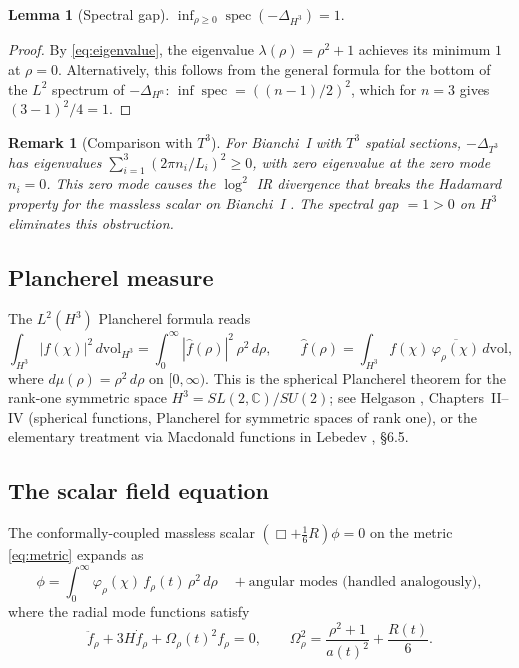\documentclass[12pt,letterpaper]{article}
\newtheorem{lemma}[theorem]{Lemma}
\newtheorem{remark}[theorem]{Remark}
\newcommand{\Cbb}{\mathbb{C}}
\DeclareMathOperator{\spec}{spec}
\begin{document}
\begin{lemma}[Spectral gap]
\label{lem:specgap}
$\displaystyle\inf_{\rho \geq 0}\spec(-\Delta_{H^3}) = 1.$
\end{lemma}
\begin{proof}
By \eqref{eq:eigenvalue}, the eigenvalue $\lambda(\rho) = \rho^2 + 1$
achieves its minimum $1$ at $\rho = 0$.
Alternatively, this follows from the general formula for the bottom
of the $L^2$ spectrum of $-\Delta_{H^n}$: $\inf\spec = ((n-1)/2)^2$,
which for $n=3$ gives $(3-1)^2/4 = 1$.
\end{proof}

\begin{remark}[Comparison with $T^3$]
For Bianchi~I with $T^3$ spatial sections,
$-\Delta_{T^3}$ has eigenvalues $\sum_{i=1}^3 (2\pi n_i/L_i)^2 \geq 0$,
with zero eigenvalue at the zero mode $n_i=0$.
This zero mode causes the $\log^2$ IR divergence that breaks the
Hadamard property for the massless scalar on Bianchi~I \cite{BN23}.
The spectral gap $= 1 > 0$ on $H^3$ eliminates this obstruction.
\end{remark}

\subsection{Plancherel measure}

The $L^2(H^3)$ Plancherel formula reads
\begin{equation}
  \int_{H^3} |f(\chi)|^2\,d\mathrm{vol}_{H^3}
  = \int_0^\infty |\hat{f}(\rho)|^2\,\rho^2\,d\rho,
  \qquad \hat{f}(\rho) = \int_{H^3} f(\chi)\,\overline{\varphi_\rho(\chi)}\,d\mathrm{vol},
  \label{eq:plancherel}
\end{equation}
where $d\mu(\rho) = \rho^2\,d\rho$ on $[0,\infty)$.
This is the spherical Plancherel theorem for the rank-one symmetric
space $H^3 = SL(2,\Cbb)/SU(2)$; see Helgason \cite{Helgason84},
Chapters~II--IV (spherical functions, Plancherel for symmetric spaces
of rank one), or the elementary treatment via Macdonald functions in
Lebedev \cite{Lebedev65}, \S6.5.

\subsection{The scalar field equation}

The conformally-coupled massless scalar $(\Box + \tfrac{1}{6}R)\phi = 0$
on the metric \eqref{eq:metric} expands as
\begin{equation}
  \phi = \int_0^\infty \varphi_\rho(\chi)\,f_\rho(t)\,\rho^2\,d\rho
  \quad + \text{angular modes (handled analogously)},
\end{equation}
where the radial mode functions satisfy
\begin{equation}
  \ddot{f}_\rho + 3H\dot{f}_\rho + \Omega_\rho(t)^2 f_\rho = 0,
  \qquad \Omega_\rho^2 = \frac{\rho^2+1}{a(t)^2} + \frac{R(t)}{6}.
  \label{eq:modeeq_cosmic}
\end{equation}
\end{document}
